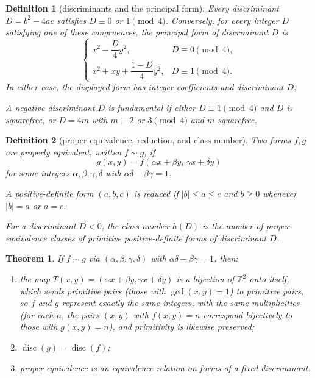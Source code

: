 \documentclass[11pt]{article}
\theoremstyle{ntstyle}
\newtheorem{theorem}{Theorem}[subsection]
\newtheorem{definition}{Definition}[subsection]
\DeclareMathOperator{\disc}{disc}
\begin{document}
\begin{definition}[discriminants and the principal form]\label{def:8.6.2}\label{def:discriminants-and-the-principal-form}
  Every discriminant $D=b^2-4ac$ satisfies
  $D\equiv0$ or $1\pmod{4}$. Conversely, for every integer $D$ satisfying
  one of these congruences, the principal form of discriminant $D$ is
  \[
    \begin{cases}
      x^2-\dfrac{D}{4}y^2,
        & D\equiv0\pmod{4},\\[4pt]
      x^2+xy+\dfrac{1-D}{4}y^2,
        & D\equiv1\pmod{4}.
    \end{cases}
  \]
  In either case, the displayed form has integer coefficients and
  discriminant $D$.

  A negative discriminant $D$ is fundamental if either
  $D\equiv1\pmod{4}$ and $D$ is squarefree, or $D=4m$ with
  $m\equiv2$ or $3\pmod{4}$ and $m$ squarefree.

\end{definition}

\begin{definition}[proper equivalence, reduction, and class number]\label{def:8.6.3}\label{def:proper-equivalence-reduction-and-class-number}
  Two forms $f,g$ are properly equivalent, written $f\sim g$, if
  \[
    g(x,y)=f(\alpha x+\beta y,\,\gamma x+\delta y)
  \]
  for some integers $\alpha,\beta,\gamma,\delta$ with
  $\alpha\delta-\beta\gamma=1$.

  A positive-definite form $(a,b,c)$ is reduced if
  $|b|\le a\le c$ and $b\ge0$ whenever $|b|=a$ or $a=c$.

  For a discriminant $D<0$, the class number $h(D)$ is the number of
  proper-equivalence classes of primitive positive-definite forms of
  discriminant $D$.

\end{definition}

\begin{theorem}\label{thm:8.6.1} If $f\sim g$ via
  $(\alpha,\beta,\gamma,\delta)$ with
  $\alpha\delta-\beta\gamma=1$, then:
  \begin{enumerate}[label={\alph*)}]
    \item the map $T(x,y)=(\alpha x+\beta y,\gamma x+\delta y)$ is a
          bijection of $\mathbb{Z}^2$ onto itself, which sends primitive
          pairs (those with $\gcd(x, y)=1$) to primitive pairs, so $f$ and
          $g$ represent exactly the same integers, with the same
          multiplicities (for each $n$, the pairs $(x,y)$ with $f(x,y)=n$ correspond bijectively to those with
          $g(x,y)=n$), and primitivity is likewise preserved;
    \item $\disc(g)=\disc(f)$;
    \item proper equivalence is an equivalence relation on forms of a
          fixed discriminant.
  \end{enumerate}

\end{theorem}
\end{document}
